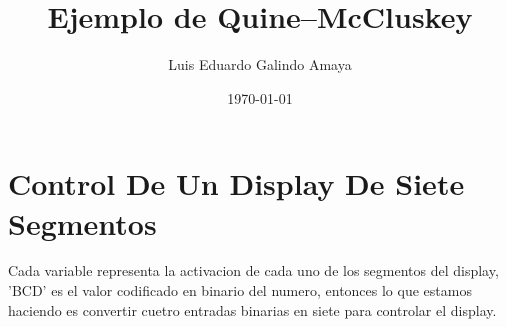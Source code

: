\documentclass[11pt]{article}
\author{Luis Eduardo Galindo Amaya}
\date{\today}
\title{Ejemplo de Quine–McCluskey}
\begin{document}
\maketitle
\tableofcontents

\toc

\newpage

\section{Control De Un Display De Siete Segmentos}
\label{sec:orgbf0d6db}
Cada variable representa la activacion de cada uno de los segmentos del 
display, 'BCD' es el valor codificado en binario del numero, entonces
lo que estamos haciendo es convertir cuetro entradas binarias en siete
para controlar el display.

\vspace{0.5cm}
\end{document}
